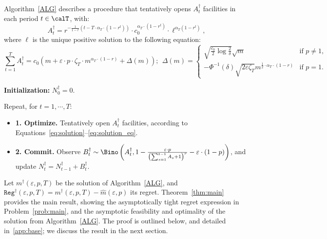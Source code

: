 \documentclass[blindrev]{informs3noheader}
\begin{document}
Algorithm~\ref{ALG} describes a procedure that tentatively opens $A^\dagger_t$ facilities in each period $t\in\calT$, with:
\begin{equation}\label{eq:solution}
    A^\dagger_t=
        r^{-\frac{1}{1-r}\left(t-T\cdot\alpha_T\cdot(1-r^t)\right)}\cdot c_0^{\alpha_T\cdot(1-r^t)}\cdot \ell^{\alpha_T(1-r^t)},
\end{equation}
where $\ell$ is the unique positive solution to the following equation:
\begin{equation} \label{eq:solution_eq}
\sum_{t=1}^T A^\dagger_t= c_0 \left(m + \varepsilon\cdot p\cdot\zeta_T\cdot m^{\alpha_T\cdot(1-r)}+ \Delta(m)\right);\   \ \Delta(m) = \begin{cases}
\sqrt{\frac{c_0}{2}\log \frac{2}{\delta}}\sqrt{m} & \text{if }p \neq 1,\\
-\Phi^{-1}(\delta) \sqrt{2\varepsilon \zeta_T} m^{\frac{1}{2}\cdot \alpha_T \cdot (1-r)}& \text{if }p = 1.
\end{cases}
\end{equation}
\begin{algorithm} [h!]
\caption{Algorithm to solve Problem~\eqref{prob:main}.}\small
\label{ALG}
\begin{algorithmic}
\item \textbf{Initialization:} $N^\dagger_0=0$.
\item Repeat, for $t=1,\cdots,T$:
\begin{itemize}
\item[] \textbf{1. Optimize.} Tentatively open $A^\dagger_t$ facilities, according to Equations~\eqref{eq:solution}--\eqref{eq:solution_eq}.
\item[] \textbf{2. Commit.} Observe $B^\dagger_t\sim \Bino\left(A^\dagger_t, 1- \frac{\varepsilon\cdot p}{\left(\sum_{s=1}^{t-1} A_s +1\right)^r}-\varepsilon\cdot(1-p)\right)$, and update $N^\dagger_t=N^\dagger_{t-1} + B^\dagger_t$.
\end{itemize}
\end{algorithmic}
\end{algorithm}

Let $m^\dagger(\varepsilon,p,T)$ be the solution of Algorithm~\ref{ALG}, and $\texttt{Reg}^\dagger(\varepsilon,p,T)=m^\dagger(\varepsilon, p,T)-\widehat{m}(\varepsilon,p)$ its regret. Theorem~\ref{thm:main} provides the main result, showing the asymptotically tight regret expression in Problem~\eqref{prob:main}, and the asymptotic feasibility and optimality of the solution from Algorithm~\ref{ALG}. The proof is outlined below, and detailed in~\ref{app:base}; we discuss the result in the next section.
\end{document}

